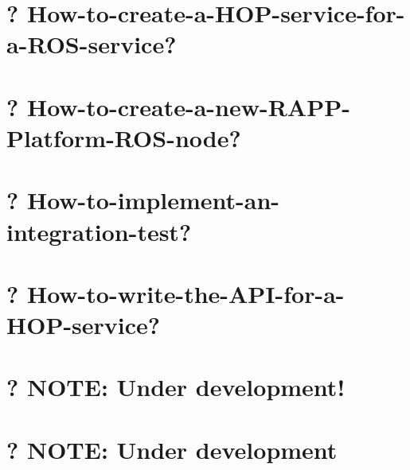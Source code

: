 \documentclass[twoside]{book}
\begin{document}
\chapter{? How-\/to-\/create-\/a-\/\-H\-O\-P-\/service-\/for-\/a-\/\-R\-O\-S-\/service?}
\label{md_rapp-platform_8wiki_How-to-create-a-HOP-service-for-a-ROS-service}
\hypertarget{md_rapp-platform_8wiki_How-to-create-a-HOP-service-for-a-ROS-service}{}

\chapter{? How-\/to-\/create-\/a-\/new-\/\-R\-A\-P\-P-\/\-Platform-\/\-R\-O\-S-\/node?}
\label{md_rapp-platform_8wiki_How-to-create-a-new-RAPP-Platform-ROS-node}
\hypertarget{md_rapp-platform_8wiki_How-to-create-a-new-RAPP-Platform-ROS-node}{}

\chapter{? How-\/to-\/implement-\/an-\/integration-\/test?}
\label{md_rapp-platform_8wiki_How-to-implement-an-integration-test}
\hypertarget{md_rapp-platform_8wiki_How-to-implement-an-integration-test}{}

\chapter{? How-\/to-\/write-\/the-\/\-A\-P\-I-\/for-\/a-\/\-H\-O\-P-\/service?}
\label{md_rapp-platform_8wiki_How-to-write-the-API-for-a-HOP-service}
\hypertarget{md_rapp-platform_8wiki_How-to-write-the-API-for-a-HOP-service}{}

\chapter{? N\-O\-T\-E\-: Under development!}
\label{md_rapp-platform_8wiki_I-do-not-even-want-to-try-the-easier-way_8-Do-you-have-something-up-and-running-to-test}
\hypertarget{md_rapp-platform_8wiki_I-do-not-even-want-to-try-the-easier-way_8-Do-you-have-something-up-and-running-to-test}{}

\chapter{? N\-O\-T\-E\-: Under development}
\label{md_rapp-platform_8wiki_I-do-not-want-to-install-RAPP-Platform_8-Is-there-an-easier-way-to-use-it}
\hypertarget{md_rapp-platform_8wiki_I-do-not-want-to-install-RAPP-Platform_8-Is-there-an-easier-way-to-use-it}{}

\end{document}
